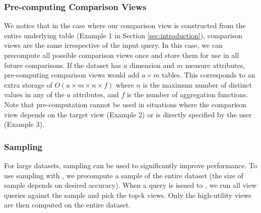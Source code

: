 
 \subsubsection {Pre-computing Comparison Views}
  We notice that in the case where our comparison view is constructed from the
  entire underlying table (Example 1 in Section \ref{sec:introduction}),
  comparison views are the same irrespective of the input query.
  In this case, we can precompute all possible comparison views once and store
  them for use in all future comparisons. If the dataset has $a$ dimension and
  $m$ measure attributes, 
  pre-computing comparison views would add $a \times m$
  tables. This corresponds to an extra storage of $O(a\times m \times n \times f)$ where $n$
  is the maximum number of distinct values in any of the $a$ attributes,
  and $f$ is the number of aggregation functions. 
  Note that pre-computation cannot be used in situations where the comparison
  view depends on the target view (Example 2) or is directly specified by the
  user (Example 3).
  
\subsubsection {Sampling}
  For large datasets, sampling can be used to significantly improve
  performance. To use sampling with \VizRecDB, we precompute a sample of the
  entire dataset (the size of sample depends on desired accuracy). When a query is
  issued to \VizRecDB, we run all view queries against the sample and pick the
  top-k views. Only the high-utility views are then computed on the entire
  dataset. \\


